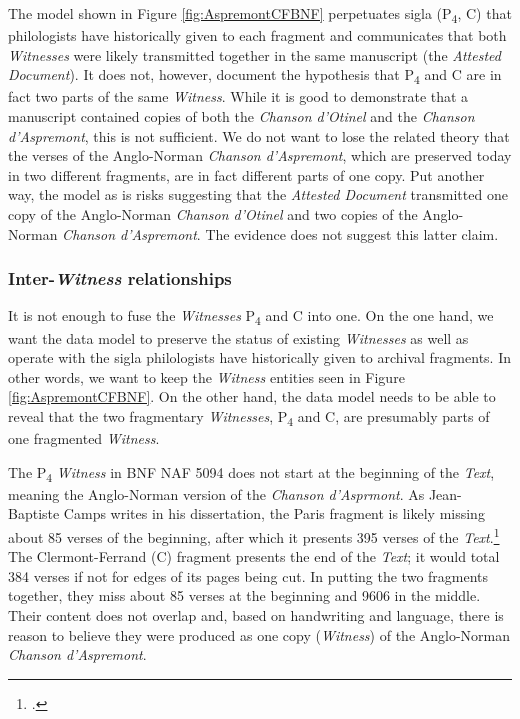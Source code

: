 The model shown in Figure \ref{fig:AspremontCFBNF} perpetuates sigla (P\textsubscript{4}, C) that philologists have historically given to each fragment and communicates that both \textit{Witnesses} were likely transmitted together in the same manuscript (the \textit{Attested Document}). It does not, however, document the hypothesis that P\textsubscript{4} and C are in fact two parts of the same \textit{Witness}. While it is good to demonstrate that a manuscript contained copies of both the \textit{Chanson d'Otinel} and the \textit{Chanson d'Aspremont}, this is not sufficient. We do not want to lose the related theory that the verses of the Anglo-Norman \textit{Chanson d'Aspremont}, which are preserved today in two different fragments, are in fact different parts of one copy. Put another way, the model as is risks suggesting that the \textit{Attested Document} transmitted one copy of the Anglo-Norman \textit{Chanson d'Otinel} and two copies of the Anglo-Norman \textit{Chanson d'Aspremont}. The evidence does not suggest this latter claim.

\subsubsection{Inter-\textit{Witness} relationships}

It is not enough to fuse the \textit{Witnesses} P\textsubscript{4} and C into one. On the one hand, we want the data model to preserve the status of existing \textit{Witnesses} as well as operate with the sigla philologists have historically given to archival fragments. In other words, we want to keep the \textit{Witness} entities seen in Figure \ref{fig:AspremontCFBNF}. On the other hand, the data model needs to be able to reveal that the two fragmentary \textit{Witnesses}, P\textsubscript{4} and C, are presumably parts of one fragmented \textit{Witness}.

The P\textsubscript{4} \textit{Witness} in BNF NAF 5094 does not start at the beginning of the \textit{Text}, meaning the Anglo-Norman version of the \textit{Chanson d'Asprmont}. As Jean-Baptiste Camps writes in his dissertation, the Paris fragment is likely missing about 85 verses of the beginning, after which it presents 395 verses of the \textit{Text}.\footcite[][xcvi]{camps2016} The Clermont-Ferrand (C) fragment presents the end of the \textit{Text}; it would total 384 verses if not for edges of its pages being cut. In putting the two fragments together, they miss about 85 verses at the beginning and 9606 in the middle. Their content does not overlap and, based on handwriting and language, there is reason to believe they were produced as one copy (\textit{Witness}) of the Anglo-Norman \textit{Chanson d'Aspremont}.

